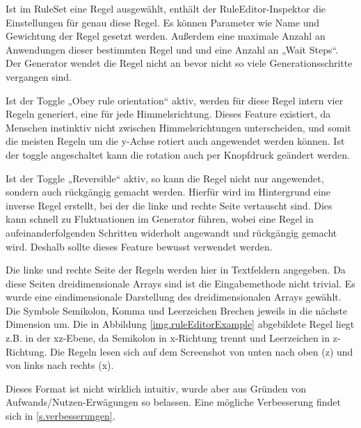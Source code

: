 
Ist im RuleSet eine Regel ausgewählt, enthält der RuleEditor-Inspektor die Einstellungen für genau diese Regel. Es können Parameter wie Name und Gewichtung der Regel gesetzt werden. Außerdem eine maximale Anzahl an Anwendungen dieser bestimmten Regel und und eine Anzahl an „Wait Steps“. Der Generator wendet die Regel nicht an bevor nicht so viele Generationsschritte vergangen sind.

Ist der Toggle „Obey rule orientation“ aktiv, werden für diese Regel intern vier Regeln generiert, eine für jede Himmelsrichtung. Dieses Feature existiert, da Menschen instinktiv nicht zwischen Himmelsrichtungen unterscheiden, und somit die meisten Regeln um die y-Achse rotiert auch angewendet werden können. Ist der toggle angeschaltet kann die rotation auch per Knopfdruck geändert werden. 

Ist der Toggle „Reversible“ aktiv, so kann die Regel nicht nur angewendet, sondern auch rückgängig gemacht werden. Hierfür wird im Hintergrund eine inverse Regel erstellt, bei der die linke und rechte Seite vertauscht sind. Dies kann schnell zu Fluktuationen im Generator führen, wobei eine Regel in aufeinanderfolgenden Schritten widerholt angewandt und rückgängig gemacht wird. Deshalb sollte dieses Feature bewusst verwendet werden.

Die linke und rechte Seite der Regeln werden hier in Textfeldern angegeben. Da diese Seiten  dreidimensionale Arrays sind ist die Eingabemethode nicht trivial. Es wurde eine eindimensionale Darstellung des dreidimensionalen Arrays gewählt. Die Symbole Semikolon, Komma und Leerzeichen Brechen jeweils in die nächste Dimension um. Die in Abbildung \ref{img.ruleEditorExample} abgebildete Regel liegt z.B. in der xz-Ebene, da Semikolon in x-Richtung trennt und Leerzeichen in z-Richtung. Die Regeln lesen sich auf dem Screenshot von unten nach oben (z) und von links nach rechts (x).


Dieses Format ist nicht wirklich intuitiv, wurde aber aus Gründen von Aufwands/Nutzen-Erwägungen so belassen. Eine mögliche Verbesserung findet sich in \ref{s.verbesserungen}.


